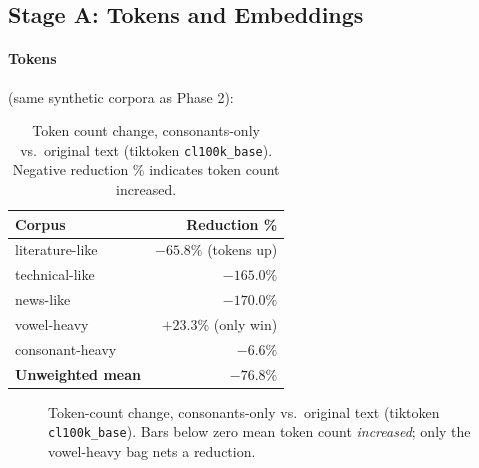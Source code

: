 \documentclass{article}
\begin{document}
\FloatBarrier
\subsection{Stage A: Tokens and Embeddings}

\paragraph{Tokens} (same synthetic corpora as Phase 2):

\begin{table}[h]
	\caption{Token count change, consonants-only vs.\ original text (tiktoken \texttt{cl100k\_base}). Negative reduction \% indicates token count increased.}
	\centering
	\begin{tabular}{lr}
		\toprule
		Corpus              & Reduction \%              \\
		\midrule
		literature-like     & $-65.8\%$ (tokens up)     \\
		technical-like      & $-165.0\%$                \\
		news-like           & $-170.0\%$                \\
		vowel-heavy         & $+23.3\%$ (only win)      \\
		consonant-heavy     & $-6.6\%$                  \\
		\midrule
		\textbf{Unweighted mean} & $\mathbf{-76.8\%}$    \\
		\bottomrule
	\end{tabular}
	\label{tab:tokens}
\end{table}

\begin{figure}[ht]
	\centering
	\caption{Token-count change, consonants-only vs.\ original text (tiktoken \texttt{cl100k\_base}). Bars below zero mean token count \emph{increased}; only the vowel-heavy bag nets a reduction.}
	\label{fig:tokens-bar}
\end{figure}
\end{document}
